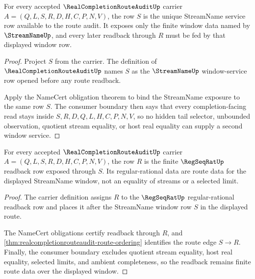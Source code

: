 \begin{theorem}
\label{thm:realcompletionrouteaudit-streamname-service}
For every accepted $\RealCompletionRouteAuditUp$ carrier $A=(Q,L,S,R,D,H,C,P,N,V)$, the row $S$ is the unique StreamName service row available to the route audit. It exposes only the finite window data named by $\StreamNameUp$, and every later readback through $R$ must be fed by that displayed window row.
\end{theorem}
\begin{proof}
Project $S$ from the carrier. The definition of $\RealCompletionRouteAuditUp$ names $S$ as the $\StreamNameUp$ window-service row opened before any route readback.

Apply the NameCert obligation theorem to bind the StreamName exposure to the same row $S$. The consumer boundary then says that every completion-facing read stays inside $S,R,D,Q,L,H,C,P,N,V$, so no hidden tail selector, unbounded observation, quotient stream equality, or host real equality can supply a second window service.
\end{proof}

\begin{theorem}
\label{thm:realcompletionrouteaudit-regseqrat-readback-service}
For every accepted $\RealCompletionRouteAuditUp$ carrier $A=(Q,L,S,R,D,H,C,P,N,V)$, the row $R$ is the finite $\RegSeqRatUp$ readback row exposed through $S$. Its regular-rational data are route data for the displayed StreamName window, not an equality of streams or a selected limit.
\end{theorem}
\begin{proof}
The carrier definition assigns $R$ to the $\RegSeqRatUp$ regular-rational readback row and places it after the StreamName window row $S$ in the displayed route.

The NameCert obligations certify readback through $R$, and \autoref{thm:realcompletionrouteaudit-route-ordering} identifies the route edge $S\to R$. Finally, the consumer boundary excludes quotient stream equality, host real equality, selected limits, and ambient completeness, so the readback remains finite route data over the displayed window.
\end{proof}

